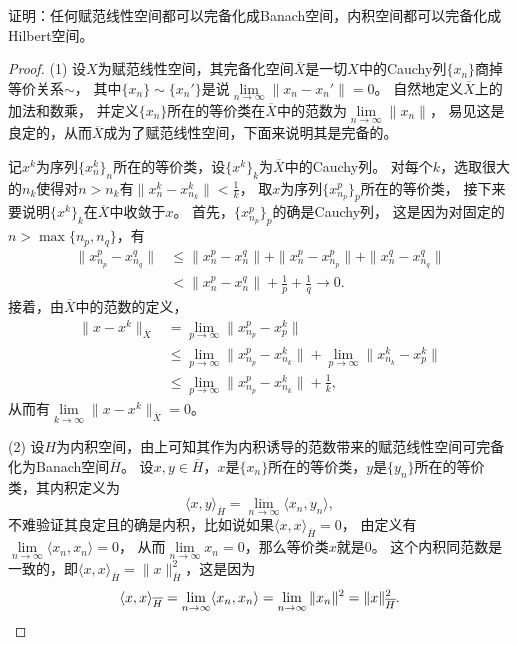 \begin{23}
    证明：任何赋范线性空间都可以完备化成Banach空间，内积空间都可以完备化成Hilbert空间。
\end{23}
\begin{proof}
    (1) 设$X$为赋范线性空间，其完备化空间$\overline{X}$是一切$X$中的Cauchy列$\{x_n\}$商掉等价关系$\sim$，
    其中$\{x_n\}\sim\{x_n'\}$是说$\lim\limits_{n\to\infty}\|x_n-x_n'\|=0$。
    自然地定义$\overline{X}$上的加法和数乘，
    并定义$\{x_n\}$所在的等价类在$\overline{X}$中的范数为$\lim\limits_{n\to\infty}\|x_n\|$，
    易见这是良定的，从而$\overline{X}$成为了赋范线性空间，下面来说明其是完备的。

    记$x^k$为序列$\big\{x_n^k\big\}_n$所在的等价类，设$\{x^k\}_k$为$\overline{X}$中的Cauchy列。
    对每个$k$，选取很大的$n_k$使得对$n>n_k$有$\|x_n^k-x_{n_k}^k\|<\frac{1}{k}$，
    取$x$为序列$\big\{x_{n_p}^p\big\}_p$所在的等价类，
    接下来要说明$\{x^k\}_k$在$\overline{X}$中收敛于$x$。
    首先，$\big\{x_{n_p}^p\big\}_p$的确是Cauchy列，
    这是因为对固定的$n>\max\{n_p,n_q\}$，有
    \begin{align*}
        \|x_{n_p}^p-x_{n_q}^q\|&\leqslant\|x_n^p-x_n^q\|+\|x_n^p-x_{n_p}^p\|+\|x_n^q-x_{n_q}^q\|\\
        &<\|x_n^p-x_n^q\|+\tfrac{1}{p}+\tfrac{1}{q}\to0.
    \end{align*}
    接着，由$\overline{X}$中的范数的定义，
    \begin{align*}
        \|x-x^k\|_{\overline{X}}&=\lim_{p\to\infty}\|x_{n_p}^p-x_p^k\|\\
        &\leqslant\lim_{p\to\infty}\|x_{n_p}^p-x_{n_k}^k\|+\lim_{p\to\infty}\|x_{n_k}^k-x_p^k\|\\
        &\leqslant\lim_{p\to\infty}\|x_{n_p}^p-x_{n_k}^k\|+\tfrac{1}{k},
    \end{align*}
    从而有$\lim\limits_{k\to\infty}\|x-x^k\|_{\overline{X}}=0$。

    (2) 设$H$为内积空间，由上可知其作为内积诱导的范数带来的赋范线性空间可完备化为Banach空间$\overline{H}$。
    设$x,y\in\overline{H}$，$x$是$\{x_n\}$所在的等价类，$y$是$\{y_n\}$所在的等价类，其内积定义为
    \[\langle x,y \rangle_{\overline{H}}=\lim_{n\to\infty}\langle x_n,y_n \rangle,\]
    不难验证其良定且的确是内积，比如说如果$\langle x,x \rangle_{\overline{H}}=0$，
    由定义有$\lim\limits_{n\to\infty}\langle x_n,x_n \rangle=0$，
    从而$\lim\limits_{n\to\infty}x_n=0$，那么等价类$x$就是$0$。
    这个内积同范数是一致的，即$\langle x,x \rangle_{\overline{H}}=\|x\|^2_{\overline{H}}$，这是因为
    \[\langle x,x \rangle_{\overline{H}}=\lim_{n\to\infty}\langle x_n,x_n \rangle
    =\lim_{n\to\infty}\|x_n\|^2=\|x\|^2_{\overline{H}}.\qedhere\]
\end{proof}

